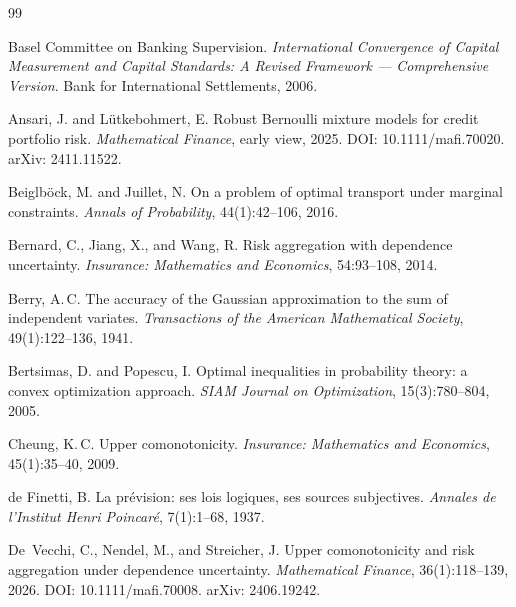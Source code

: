 \documentclass[11pt]{article}
\theoremstyle{definition}
\newcommand{\1}{\mathbf{1}}
\begin{document}

\begin{thebibliography}{99}

Basel Committee on Banking Supervision.
\newblock \emph{International Convergence of Capital Measurement and Capital Standards: A Revised Framework --- Comprehensive Version}.
\newblock Bank for International Settlements, 2006.

Ansari, J. and L\"utkebohmert, E.
\newblock Robust Bernoulli mixture models for credit portfolio risk.
\newblock \emph{Mathematical Finance}, early view, 2025.
\newblock DOI: 10.1111/mafi.70020. arXiv: 2411.11522.

Beiglb\"ock, M. and Juillet, N.
\newblock On a problem of optimal transport under marginal constraints.
\newblock \emph{Annals of Probability}, 44(1):42--106, 2016.

Bernard, C., Jiang, X., and Wang, R.
\newblock Risk aggregation with dependence uncertainty.
\newblock \emph{Insurance: Mathematics and Economics}, 54:93--108, 2014.

Berry, A.\,C.
\newblock The accuracy of the Gaussian approximation to the sum of independent variates.
\newblock \emph{Transactions of the American Mathematical Society}, 49(1):122--136, 1941.

Bertsimas, D. and Popescu, I.
\newblock Optimal inequalities in probability theory: a convex optimization approach.
\newblock \emph{SIAM Journal on Optimization}, 15(3):780--804, 2005.

Cheung, K.\,C.
\newblock Upper comonotonicity.
\newblock \emph{Insurance: Mathematics and Economics}, 45(1):35--40, 2009.

de Finetti, B.
\newblock La pr\'evision: ses lois logiques, ses sources subjectives.
\newblock \emph{Annales de l'Institut Henri Poincar\'e}, 7(1):1--68, 1937.

De~Vecchi, C., Nendel, M., and Streicher, J.
\newblock Upper comonotonicity and risk aggregation under dependence uncertainty.
\newblock \emph{Mathematical Finance}, 36(1):118--139, 2026.
\newblock DOI: 10.1111/mafi.70008. arXiv: 2406.19242.


\end{thebibliography}
\end{document}
